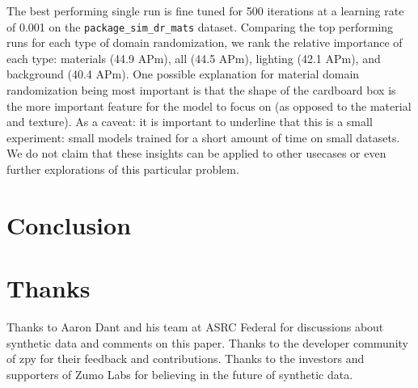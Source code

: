 \documentclass{article}
\begin{document}
The best performing single run is fine tuned for 500 iterations at a learning rate of 0.001 on the \lstinline{package_sim_dr_mats} dataset. Comparing the top performing runs for each type of domain randomization, we rank the relative importance of each type: materials (44.9 APm), all (44.5 APm), lighting (42.1 APm), and background (40.4 APm). One possible explanation for material domain randomization being most important is that the shape of the cardboard box is the more important feature for the model to focus on (as opposed to the material and texture). As a caveat: it is important to underline that this is a small experiment: small models trained for a short amount of time on small datasets. We do not claim that these insights can be applied to other usecases or even further explorations of this particular problem. 

\section{Conclusion}
\label{sec:conclusion}



\section{Thanks}
\label{sec:thanks}

Thanks to Aaron Dant and his team at ASRC Federal for discussions about synthetic data and comments on this paper. Thanks to the developer community of zpy for their feedback and contributions. Thanks to the investors and supporters of Zumo Labs for believing in the future of synthetic data.



\end{document}
